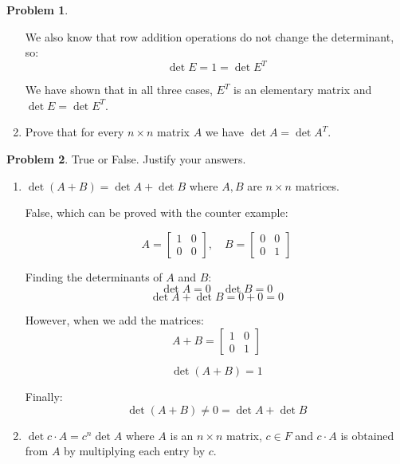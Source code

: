 \documentclass[12pt, oneside]{amsart}
\theoremstyle{definition}
\newtheorem{prob}{Problem}
\begin{document}
\begin{prob}
\begin{enumerate}
\begin{solution}
    We also know that row addition operations do not change the determinant, so:
    \[
    \det E = 1 = \det E^T
    \]
    
    \vspace{0.3cm}
    
    We have shown that in all three cases, $E^T$ is an elementary matrix and $\det E = \det E^T$. 
    \end{solution}
    
    \item Prove that for every $n\times n$ matrix $A$ we have $\det A = \det A^T$.
    \end{enumerate}
\end{prob}

\begin{prob} True or False. Justify your answers.
\begin{enumerate}
    \item  $\det (A+B) = \det A  +\det B$ where $A,B$ are $n\times n$ matrices.
    
    \begin{solution}
    False, which can be proved with the counter example:
    
    \[
    A = \begin{bmatrix} 1 & 0 \\ 0 & 0 \end{bmatrix}, \quad B = \begin{bmatrix} 0 & 0 \\ 0 & 1 \end{bmatrix}
    \]
    
    Finding the determinants of $A$ and $B$:
    \[
    \det A = 0 \quad \det B = 0
    \]
    \[
    \det A + \det B = 0 + 0 = 0
    \]
    
    However, when we add the matrices:
    \[
    A + B = \begin{bmatrix} 1 & 0 \\ 0 & 1 \end{bmatrix}
    \]
    
    \[
    \det(A+B) = 1 
    \]

    Finally:
  \[
  \det(A+B) \neq 0 = \det A + \det B
  \]

    \end{solution}
    
    \item $\det c\cdot A = c^n \det A$ where $A$ is an $n\times n$ matrix, $c\in F$ and $c\cdot A$ is obtained from $A$ by multiplying each entry by $c$.
    

\end{enumerate}
\end{prob}
\end{document}
